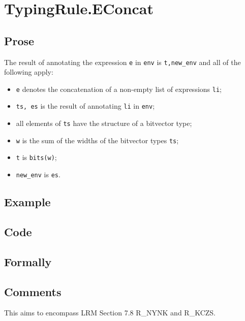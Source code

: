 \documentclass{book}
\begin{document}

\section{TypingRule.EConcat \label{sec:TypingRule.EConcat}}

  \subsection{Prose}
  The result of annotating the expression \texttt{e} in \texttt{env} is
\texttt{t,new\_env} and all of the following apply:
  \begin{itemize}
  \item \texttt{e} denotes the concatenation of a non-empty list of expressions \texttt{li};
  \item \texttt{ts, es} is the result of annotating \texttt{li} in \texttt{env};
  \item all elements of \texttt{ts} have the structure of a bitvector type;
  \item \texttt{w} is the sum of the widths of the bitvector types \texttt{ts};
  \item \texttt{t} is \texttt{bits(w)};
  \item \texttt{new\_env} is \texttt{es}.
  \end{itemize}

  \subsection{Example}

  \subsection{Code}

\begin{emptyformal}
    \subsection{Formally}
\end{emptyformal}

\subsection{Comments}
  This aims to encompass LRM Section 7.8 R\_NYNK and R\_KCZS.
\end{document}
